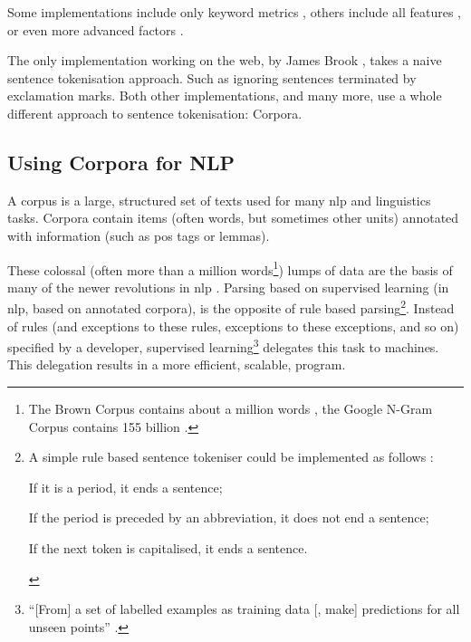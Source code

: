 \noindent Some implementations include only keyword metrics
  \autocite{jbrooksuk/node-summary-source-code}, others include all features
  \autocite{MojoJolo/textteaser-source-code}, or even more advanced factors
  \autocite{summly}.

The only implementation working on the web, by James Brook
  \autocite*{jbrooksuk/node-summary-source-code}, takes a naive sentence
  tokenisation approach.
Such as ignoring sentences terminated by exclamation marks.
Both other implementations, and many more, use a whole different approach to
  sentence tokenisation: Corpora.

\subsection{Using Corpora for NLP}\label{using-corpora-for}

A corpus is a large, structured set of texts used for many \gls{nlp}
  and linguistics tasks.
Corpora contain items (often words, but sometimes other units) annotated
  with information (such as \gls{pos} tags or lemmas).

These colossal (often more than a million words\footnote{The Brown Corpus
    contains about a million words \autocite{francis-nelson-brown-corpus},
    the Google N-Gram Corpus contains 155 billion
    \autocite{brants-thorsten-google-ngram-corpus}.})
  lumps of data are the basis of many of the newer revolutions in \gls{nlp}
  \autocite{mitkov-ruslan-ea-importance-corpora}.
Parsing based on supervised learning (in \gls{nlp}, based on annotated
  corpora), is the opposite of rule based parsing\footnote{A simple
    rule based sentence tokeniser could be implemented as follows
    \autocite{attivio.com-doing-things-with-sentences}:

    \begin{aenumerate}
      \item If it is a period, it ends a sentence;
      \item If the period is preceded by an abbreviation, it does not end
        a sentence;
      \item If the next token is capitalised, it ends a sentence.
    \end{aenumerate}}.
Instead of rules (and exceptions to these rules, exceptions to these
  exceptions, and so on) specified by a developer,
  supervised learning\footnote{``{[}From{]} a set of labelled examples as
    training data {[}, make{]} predictions for all unseen points''
    \autocite{mohri-mehryar-foundations-machine-learning}.}
  delegates this task to machines.
This delegation results in a more efficient, scalable, program.

